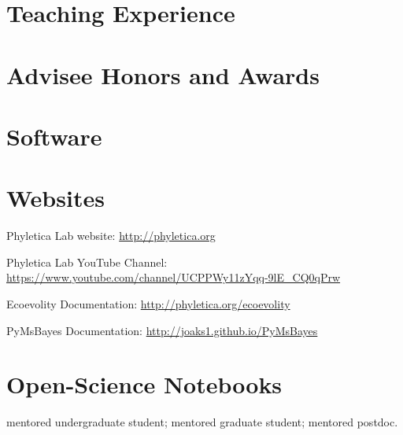 \section*{Teaching Experience}


\section*{Advisee Honors and Awards}


\section*{Software}


\section*{Websites}
\begin{tightItemize}
    \item Phyletica Lab website: \url{http://phyletica.org}
    \item Phyletica Lab YouTube Channel: \url{https://www.youtube.com/channel/UCPPWy11zYqq-9lE_CQ0qPrw}
    \item Ecoevolity Documentation: \url{http://phyletica.org/ecoevolity}
    \item PyMsBayes Documentation: \url{http://joaks1.github.io/PyMsBayes}
\end{tightItemize}

\section*{Open-Science Notebooks}
\ugsymbol{}mentored undergraduate student;
\phdsymbol{}mentored graduate student;
\postdocsymbol{}mentored postdoc.
\nocite{*}
\printbibliography[filter=openscinotebooks, heading=none]



